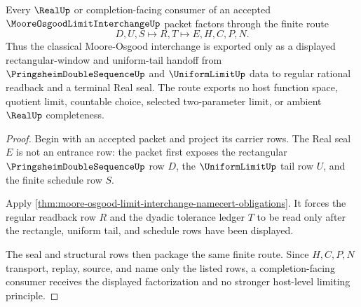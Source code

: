 \begin{theorem}
\label{thm:moore-osgood-limit-interchange-real-handoff}
Every $\RealUp$ or completion-facing consumer of an accepted $\MooreOsgoodLimitInterchangeUp$ packet factors through the finite route
$$
D,U,S \longmapsto R,T \longmapsto E,H,C,P,N .
$$
Thus the classical Moore-Osgood interchange is exported only as a displayed rectangular-window and uniform-tail handoff from $\PringsheimDoubleSequenceUp$ and $\UniformLimitUp$ data to regular rational readback and a terminal Real seal. The route exports no host function space, quotient limit, countable choice, selected two-parameter limit, or ambient $\RealUp$ completeness.
\end{theorem}
\begin{proof}
Begin with an accepted packet and project its carrier rows. The Real seal $E$ is not an entrance row: the packet first exposes the rectangular $\PringsheimDoubleSequenceUp$ row $D$, the $\UniformLimitUp$ tail row $U$, and the finite schedule row $S$.

Apply \autoref{thm:moore-osgood-limit-interchange-namecert-obligations}. It forces the regular readback row $R$ and the dyadic tolerance ledger $T$ to be read only after the rectangle, uniform tail, and schedule rows have been displayed.

The seal and structural rows then package the same finite route. Since $H,C,P,N$ transport, replay, source, and name only the listed rows, a completion-facing consumer receives the displayed factorization and no stronger host-level limiting principle.
\end{proof}




